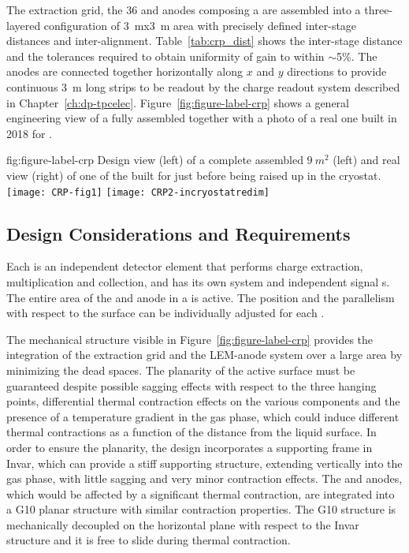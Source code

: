 The extraction grid, the \num{36}  and anodes composing a  are assembled into a three-layered configuration of \SI{3}{\m}x\SI{3}{\m} area  with precisely defined inter-stage distances and inter-alignment. Table~\ref{tab:crp_dist} shows the inter-stage distance and the tolerances required to obtain uniformity of gain to within $\sim$5\%.
The anodes are connected together horizontally along  $x$ and $y$ directions to provide continuous \SI{3}{\m} long strips to be readout by the charge readout system described in Chapter~\ref{ch:dp-tpcelec}. Figure~\ref{fig:figure-label-crp} shows a general engineering view of a  fully assembled  together with a photo of a real one built in \num{2018} for .

\begin{dunefigure}
{fig:figure-label-crp}
{Design view (left) of a complete assembled  $\SI{9}{m^{2}}$  (left) and real view (right) of one of the  built for  just before being raised up in the cryostat.}
\texttt{[image: CRP-fig1]}
\texttt{[image: CRP2-incryostatredim]}
\end{dunefigure}

 

\subsection{Design Considerations and Requirements}
\label{ch:dp-crp-consider-requirements}

Each  is an independent detector element that performs charge extraction, multiplication and collection, and has its own  system and independent signal \fdth{}s. The entire area of the  and anode in a  is active. The position and the parallelism with respect to the \lar surface can be individually adjusted for each .

The  mechanical structure visible in  Figure~\ref{fig:figure-label-crp} provides the integration of the extraction grid and the LEM-anode system over a large area by minimizing the dead spaces. The planarity of the active surface must be guaranteed despite possible sagging effects with respect to the three hanging points, differential thermal contraction effects on the various  components and the presence of a temperature gradient in the gas phase, which could induce different thermal contractions as a function of the distance from the liquid surface. In order to   ensure the planarity, the design  incorporates a supporting frame in Invar, which can provide a stiff supporting structure, extending vertically into the gas phase, with little sagging and very minor contraction effects. The  and anodes, which would be affected by a significant thermal contraction, are integrated into a G10 planar structure with similar contraction properties. The G10 structure is mechanically decoupled on the horizontal plane with respect to the Invar structure  and it is free to slide during thermal contraction.

